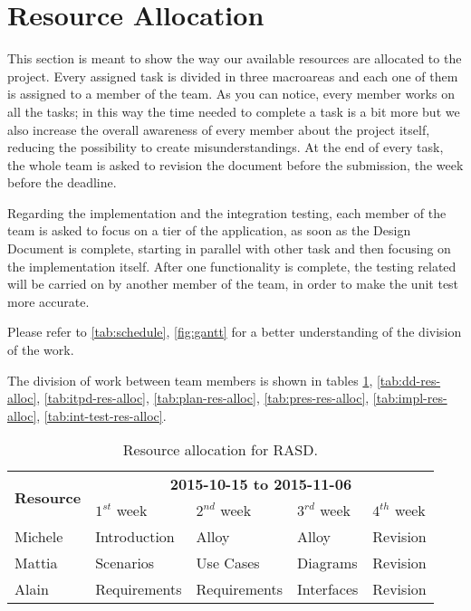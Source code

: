 \section{Resource Allocation}

This section is meant to show the way our available resources are allocated to the project. Every assigned task is divided in three macroareas and each one of them is assigned to a member of the team.
As you can notice, every member works on all the tasks; in this way the time needed to complete a task is a bit more but we also increase the overall awareness of every member about the project itself, reducing the possibility to create misunderstandings.
At the end of every task, the whole team is asked to revision the document before the submission, the week before the deadline.

Regarding the implementation and the integration testing, each member of the team is asked to focus on a tier of the application, as soon as the Design Document is complete, starting in parallel with other task and then focusing on the implementation itself.
After one functionality is complete, the testing related will be carried on by another member of the team, in order to make the unit test more accurate.

Please refer to \autoref{tab:schedule}, \autoref{fig:gantt} for a better understanding of the division of the work.

The division of work between team members is shown in tables \ref{tab:rasd-res-alloc}, \ref{tab:dd-res-alloc}, \ref{tab:itpd-res-alloc}, \ref{tab:plan-res-alloc}, \ref{tab:pres-res-alloc}, \ref{tab:impl-res-alloc}, \ref{tab:int-test-res-alloc}.

\begin{table}[htb]
    \centering
    \begin{small}
    \begin{tabular}{| l | l | l | l | l |}
        \hline
        \multirow{2}{*}{\textbf{Resource}} & \multicolumn{4}{c|}{\textbf{2015-10-15 to 2015-11-06}} \\
        \cline{2-5}
        & $1^{st}$ week & $2^{nd}$ week & $3^{rd} $ week & $4^{th}$ week\\
        \hline
        Michele     & Introduction  & Alloy          & Alloy       & Revision    \\
        Mattia      & Scenarios     & Use Cases      & Diagrams    & Revision    \\
        Alain       & Requirements  & Requirements   & Interfaces  & Revision    \\
        \hline
    \end{tabular}
    \end{small}
    \caption{Resource allocation for RASD.}
    \label{tab:rasd-res-alloc}
\end{table}

